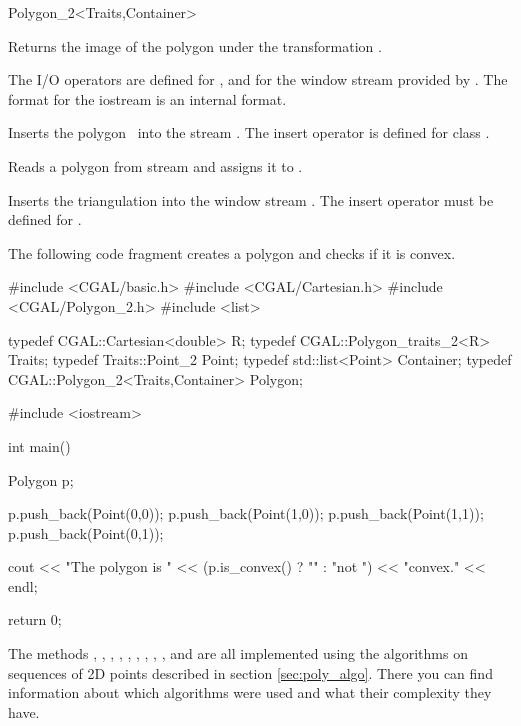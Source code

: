 \begin{ccClassTemplate}{Polygon_2<Traits,Container>}

  { Returns the image of the polygon  under the transformation . }


The I/O operators are defined for , and for
the window stream provided by \cgal. The format for the iostream
is an internal format.

     { Inserts the polygon \ccVar\ into the stream .
       \ccPrecond The insert operator is defined for class .}

     { Reads a polygon from stream  and assigns it
       to \ccVar.}


{
Inserts the triangulation  into the window stream .
The insert operator must be defined for .
}

\ccExample

The following code fragment creates a polygon and checks if it is convex.

\begin{cprog}
#include <CGAL/basic.h>
#include <CGAL/Cartesian.h>
#include <CGAL/Polygon_2.h>
#include <list>

typedef CGAL::Cartesian<double> R;
typedef CGAL::Polygon_traits_2<R> Traits;
typedef Traits::Point_2 Point;
typedef std::list<Point> Container;
typedef CGAL::Polygon_2<Traits,Container> Polygon;

#include <iostream>

int main()
{
  Polygon p;

  p.push_back(Point(0,0));
  p.push_back(Point(1,0));
  p.push_back(Point(1,1));
  p.push_back(Point(0,1));

  cout << "The polygon is " << (p.is_convex() ? "" : "not ") << "convex." << endl;

  return 0;
}
\end{cprog}

The methods
,
,
,
,
,
,
,
,
,
 and
are all implemented using the algorithms on sequences of 2D points described
in section \ref{sec:poly_algo}. There you can find information about which
algorithms were used and what their complexity they have.

\end{ccClassTemplate}


